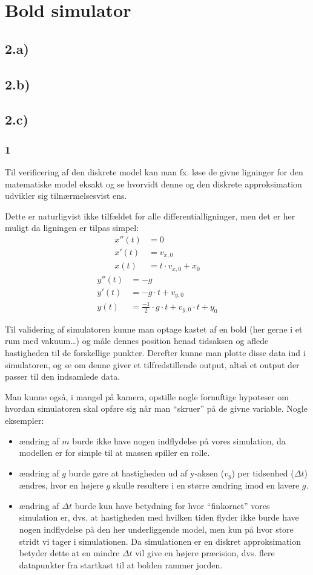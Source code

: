 \section{Bold simulator}
\subsection*{2.a)}
\subsection*{2.b)}
\subsection*{2.c)}
\subsubsection*{1}
Til verificering af den diskrete model kan man fx. løse de givne ligninger for den matematiske model
eksakt og se hvorvidt denne og den diskrete approksimation udvikler sig tilnærmelsesvist ens.

Dette er naturligvist ikke tilfældet for alle differentialligninger, men det er her muligt da ligningen
er tilpas simpel:
\begin{align}
x''(t) 	&= 0 \\
x'(t) 	&= v_{x,0} \\
x(t) 	&= t \cdot v_{x,0} + x_0 
\end{align}
\begin{align}
y''(t)	&= -g \\
y'(t)	&= -g \cdot t + v_{y,0} \\
y(t)	&= \frac{-1}{2} \cdot g \cdot t + v_{y,0} \cdot t + y_0
\end{align}

Til validering af simulatoren kunne man optage kastet af en bold (her gerne i et rum med vakuum\ldots)
og måle dennes position henad tidsaksen og aflede hastigheden til de forskellige punkter.
Derefter kunne man plotte disse data ind i simulatoren, og se om denne giver et tilfredstillende output,
altså et output der passer til den indsamlede data.

Man kunne også, i mangel på kamera, opstille nogle fornuftige hypoteser om hvordan simulatoren skal
opføre sig når man ``skruer'' på de givne variable. Nogle eksempler:
\begin{itemize}
\item ændring af $m$ burde ikke have nogen indflydelse på vores simulation, da modellen er for simple
til at massen spiller en rolle.
\item ændring af $g$ burde gøre at hastigheden ud af y-aksen ($v_y$) per tidsenhed ($\Delta t$) ændres,
hvor en højere $g$ skulle resultere i en større ændring imod en lavere $g$.
\item ændring af $\Delta t$ burde kun have betydning for hvor ``finkornet'' vores simulation er, dvs.
at hastigheden med hvilken tiden flyder ikke burde have nogen indflydelse på den her underliggende
model, men kun på hvor store stridt vi tager i simulationen.
Da simulationen er en diskret approksimation betyder dette at en mindre $\Delta t$ vil give en højere
præcision, dvs. flere datapunkter fra startkast til at bolden rammer jorden.
\end{itemize} 
